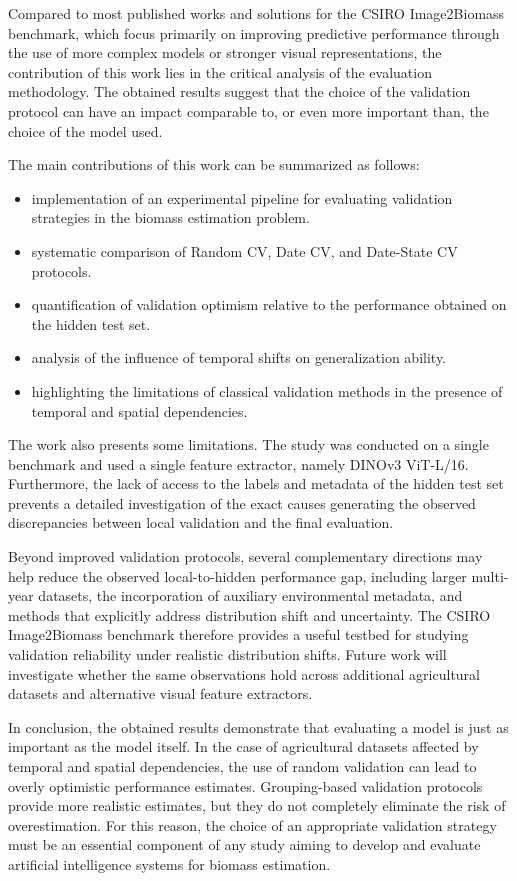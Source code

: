 Compared to most published works and solutions for the CSIRO Image2Biomass benchmark, which focus primarily on improving predictive performance through the use of more complex models or stronger visual representations, the contribution of this work lies in the critical analysis of the evaluation methodology. The obtained results suggest that the choice of the validation protocol can have an impact comparable to, or even more important than, the choice of the model used.

The main contributions of this work can be summarized as follows:

    \begin{itemize}
    \item implementation of an experimental pipeline for evaluating validation strategies in the biomass estimation problem.
    \item systematic comparison of Random CV, Date CV, and Date-State CV protocols.
    \item quantification of validation optimism relative to the performance obtained on the hidden test set.
    \item analysis of the influence of temporal shifts on generalization ability.
    \item highlighting the limitations of classical validation methods in the presence of temporal and spatial dependencies.
    \end{itemize}

The work also presents some limitations. The study was conducted on a single benchmark and used a single feature extractor, namely DINOv3 ViT-L/16. Furthermore, the lack of access to the labels and metadata of the hidden test set prevents a detailed investigation of the exact causes generating the observed discrepancies between local validation and the final evaluation.

Beyond improved validation protocols, several complementary directions may help reduce the observed local-to-hidden performance gap, including larger multi-year datasets, the incorporation of auxiliary environmental metadata, and methods that explicitly address distribution shift and uncertainty. The CSIRO Image2Biomass benchmark therefore provides a useful testbed for studying validation reliability under realistic distribution shifts. Future work will investigate whether the same observations hold across additional agricultural datasets and alternative visual feature extractors.

In conclusion, the obtained results demonstrate that evaluating a model is just as important as the model itself. In the case of agricultural datasets affected by temporal and spatial dependencies, the use of random validation can lead to overly optimistic performance estimates. Grouping-based validation protocols provide more realistic estimates, but they do not completely eliminate the risk of overestimation. For this reason, the choice of an appropriate validation strategy must be an essential component of any study aiming to develop and evaluate artificial intelligence systems for biomass estimation.
